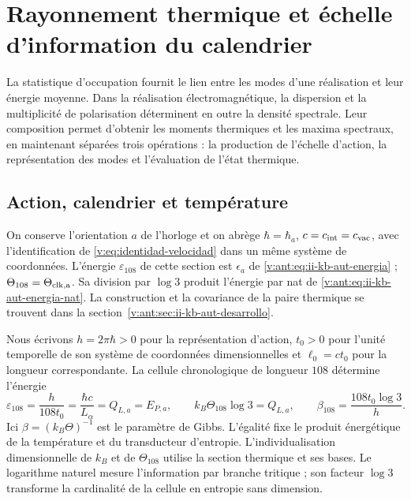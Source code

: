 \section{Rayonnement thermique et échelle d’information du calendrier}
\label{v:sec:radiacion-termica}

La statistique d’occupation fournit le lien entre les modes d’une
réalisation et leur énergie moyenne. Dans la réalisation électromagnétique,
la dispersion et la multiplicité de polarisation déterminent en outre la
densité spectrale. Leur composition permet d’obtenir les moments thermiques
et les maxima spectraux, en maintenant séparées trois opérations :
la production de l’échelle d’action, la représentation des modes et
l’évaluation de l’état thermique.

\subsection{Action, calendrier et température}

On conserve l’orientation \(a\) de l’horloge et on abrège
\(\hbar=\hbar_a\), \(c=c_{\rm int}=c_{\rm vac}\), avec
l’identification de \eqref{v:eq:identidad-velocidad} dans un même système de coordonnées.
L’énergie \(\varepsilon_{108}\) de cette section est
\(\epsilon_a\) de \eqref{v:ant:eq:ii-kb-aut-energia} ;
\(\Theta_{108}=\Theta_{\rm clk,a}\). Sa division par \(\log3\)
produit l’énergie par nat de \eqref{v:ant:eq:ii-kb-aut-energia-nat}.
La construction et la covariance de la paire thermique se trouvent dans
la section~\ref{v:ant:sec:ii-kb-aut-desarrollo}.

Nous écrivons \(h=2\pi\hbar>0\) pour la représentation d’action, \(t_0>0\)
pour l’unité temporelle de son système de coordonnées dimensionnelles et \(\ell_0=ct_0\) pour
la longueur correspondante. La cellule chronologique de longueur \(108\)
détermine l’énergie
\begin{equation}
 \varepsilon_{108}=\frac{h}{108t_0}
 =\frac{\hbar c}{L_\alpha}=Q_{L,a}=E_{P,a},\qquad
 k_B\Theta_{108}\log 3=Q_{L,a},\qquad
 \beta_{108}=\frac{108t_0\log3}{h}.
 \label{v:eq:energia-informacion-calendario}
\end{equation}
Ici \(\beta=(k_B\Theta)^{-1}\) est le paramètre de Gibbs. L’égalité
fixe le produit énergétique de la température et du transducteur
d’entropie. L’individualisation dimensionnelle de \(k_B\) et de
\(\Theta_{108}\) utilise la section thermique et ses bases. Le logarithme
naturel mesure l’information par branche tritique ; son facteur \(\log3\) transforme
la cardinalité de la cellule en entropie sans dimension.

